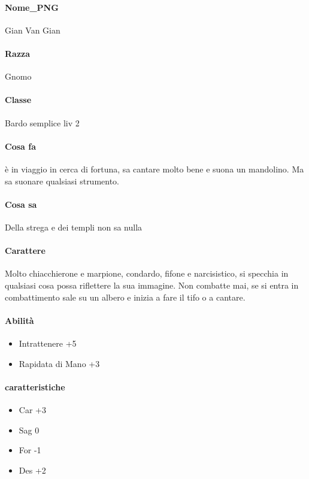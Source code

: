 \documentclass{article}
\begin{document}
\paragraph{Nome\_PNG} Gian Van Gian
\paragraph{Razza} Gnomo
\paragraph{Classe} Bardo semplice liv 2
\paragraph{Cosa fa } è in viaggio in cerca di fortuna, sa cantare molto bene e suona un mandolino. Ma sa suonare qualsiasi strumento.
\paragraph{Cosa sa} Della strega e dei templi non sa nulla
\paragraph{Carattere} Molto chiacchierone e marpione, condardo, fifone e narcisistico, si specchia in qualsiasi cosa possa riflettere la sua immagine. Non combatte mai, se si entra in combattimento sale su un albero e inizia a fare il tifo o a cantare. 
\paragraph{Abilità }
    \begin{itemize}
        \item  Intrattenere +5 
        \item Rapidata di Mano +3
    \end{itemize}
\paragraph{caratteristiche}
    \begin{itemize}
        \item  Car +3 
        \item Sag 0
        \item For -1
        \item Des +2
    \end{itemize}
\end{document}
